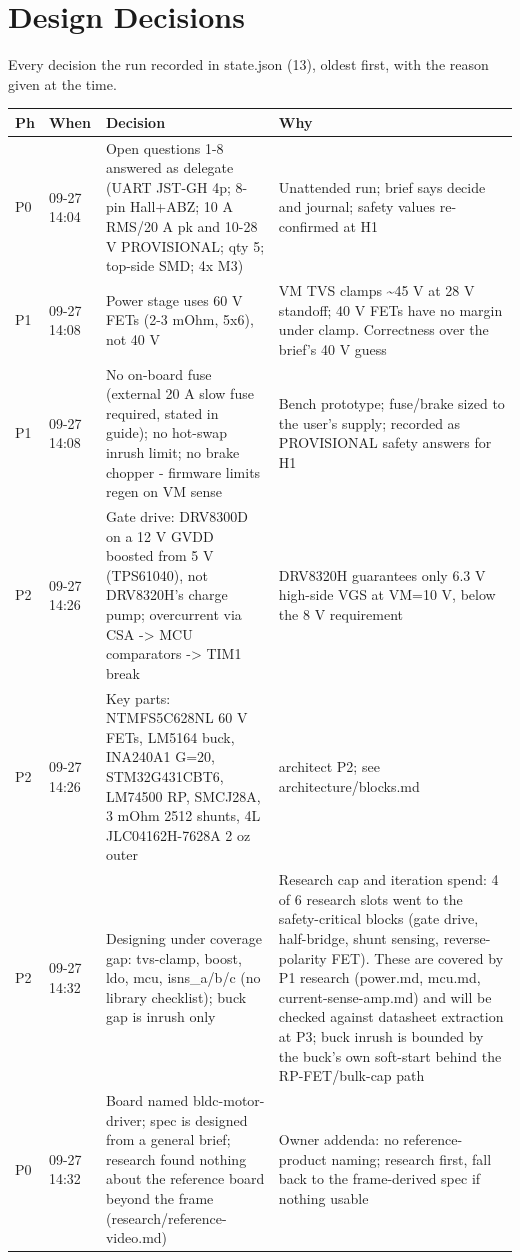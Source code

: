 \documentclass[11pt,a4paper]{article}
\begin{document}
\section{Design Decisions}
Every decision the run recorded in state.json (13), oldest first, with the reason given at the time.
{\small
\begin{longtable}{lp{1.6cm}p{6.2cm}p{6.2cm}}
\toprule
\textbf{Ph} & \textbf{When} & \textbf{Decision} & \textbf{Why} \\
\midrule
\endhead
P0 & 09-27 14:04 & Open questions 1-8 answered as delegate (UART JST-GH 4p; 8-pin Hall+ABZ; 10 A RMS/20 A pk and 10-28 V PROVISIONAL; qty 5; top-side SMD; 4x M3) & Unattended run; brief says decide and journal; safety values re-confirmed at H1 \\
P1 & 09-27 14:08 & Power stage uses 60 V FETs (2-3 mOhm, 5x6), not 40 V & VM TVS clamps \textasciitilde{}45 V at 28 V standoff; 40 V FETs have no margin under clamp. Correctness over the brief's 40 V guess \\
P1 & 09-27 14:08 & No on-board fuse (external 20 A slow fuse required, stated in guide); no hot-swap inrush limit; no brake chopper - firmware limits regen on VM sense & Bench prototype; fuse/brake sized to the user's supply; recorded as PROVISIONAL safety answers for H1 \\
P2 & 09-27 14:26 & Gate drive: DRV8300D on a 12 V GVDD boosted from 5 V (TPS61040), not DRV8320H's charge pump; overcurrent via CSA -\textgreater{} MCU comparators -\textgreater{} TIM1 break & DRV8320H guarantees only 6.3 V high-side VGS at VM=10 V, below the 8 V requirement \\
P2 & 09-27 14:26 & Key parts: NTMFS5C628NL 60 V FETs, LM5164 buck, INA240A1 G=20, STM32G431CBT6, LM74500 RP, SMCJ28A, 3 mOhm 2512 shunts, 4L JLC04162H-7628A 2 oz outer & architect P2; see architecture/blocks.md \\
P2 & 09-27 14:32 & Designing under coverage gap: tvs-clamp, boost, ldo, mcu, isns\_a/b/c (no library checklist); buck gap is inrush only & Research cap and iteration spend: 4 of 6 research slots went to the safety-critical blocks (gate drive, half-bridge, shunt sensing, reverse-polarity FET). These are covered by P1 research (power.md, mcu.md, current-sense-amp.md) and will be checked against datasheet extraction at P3; buck inrush is bounded by the buck's own soft-start behind the RP-FET/bulk-cap path \\
P0 & 09-27 14:32 & Board named bldc-motor-driver; spec is designed from a general brief; research found nothing about the reference board beyond the frame (research/reference-video.md) & Owner addenda: no reference-product naming; research first, fall back to the frame-derived spec if nothing usable \\

\end{longtable}}
\end{document}
